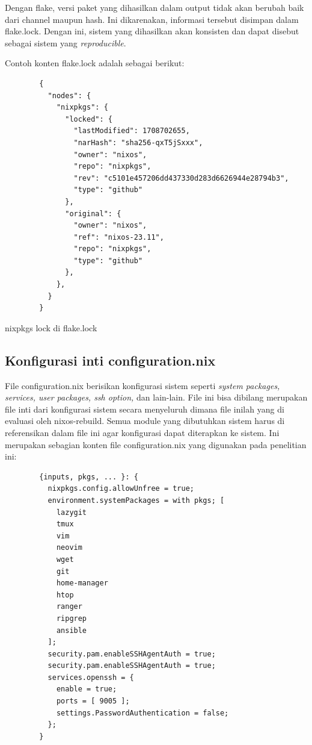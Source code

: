 \documentclass[10pt,twoside]{report}
\newenvironment{code}{\captionsetup{type=listing}}{\vspace{3mm}}
\begin{document}
\begin{adjustwidth}{20pt}{}
\begin{adjustwidth}{20pt}{}
		Dengan flake, versi paket yang dihasilkan dalam output tidak akan berubah
		baik dari channel maupun hash. Ini dikarenakan, informasi tersebut disimpan
		dalam flake.lock. Dengan ini, sistem yang dihasilkan akan konsisten dan
		dapat disebut sebagai sistem yang \textit{reproducible}.

		Contoh konten flake.lock adalah sebagai berikut:

		\begin{code}
			\begin{verbatim}
        {
          "nodes": {
            "nixpkgs": {
              "locked": {
                "lastModified": 1708702655,
                "narHash": "sha256-qxT5jSxxx",
                "owner": "nixos",
                "repo": "nixpkgs",
                "rev": "c5101e457206dd437330d283d6626944e28794b3",
                "type": "github"
              },
              "original": {
                "owner": "nixos",
                "ref": "nixos-23.11",
                "repo": "nixpkgs",
                "type": "github"
              },
            },
          }
        }
      \end{verbatim}
			\caption{nixpkgs lock di flake.lock}
		\end{code}

	\end{adjustwidth}
	\subsection{Konfigurasi inti configuration.nix}

	\begin{adjustwidth}{20pt}{}
		File configuration.nix berisikan konfigurasi sistem seperti \textit{system
			packages, services, user packages, ssh option, }dan lain-lain. File ini
		bisa dibilang merupakan file inti dari konfigurasi sistem secara menyeluruh
		dimana file inilah yang di evaluasi oleh nixos-rebuild. Semua module yang
		dibutuhkan sistem harus di referensikan dalam file ini agar konfigurasi
		dapat diterapkan ke sistem.
		Ini merupakan sebagian konten file configuration.nix yang digunakan pada
		penelitian ini:

		\begin{code}
			\begin{verbatim}
        {inputs, pkgs, ... }: {
          nixpkgs.config.allowUnfree = true;
          environment.systemPackages = with pkgs; [
            lazygit
            tmux
            vim
            neovim
            wget
            git
            home-manager
            htop
            ranger
            ripgrep
            ansible
          ];
          security.pam.enableSSHAgentAuth = true;
          security.pam.enableSSHAgentAuth = true;
          services.openssh = {
            enable = true;
            ports = [ 9005 ];
            settings.PasswordAuthentication = false;
          };
        }
      \end{verbatim}
		\end{code}
	\end{adjustwidth}

\end{adjustwidth}
\end{document}
